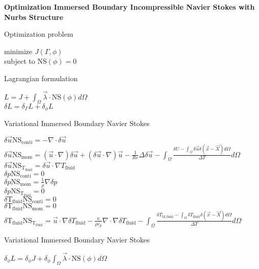 \documentclass[10pt]{article} %
\begin{document}
\begin{center}
	\textbf{Optimization Immersed Boundary Incompressible Navier Stokes with Nurbs Structure}
\begin{flushleft}
	Optimization problem
\end{flushleft}	
	minimize $J(\Gamma,\phi)$\\
	subject to $\text{NS}(\phi) = 0$
\begin{flushleft}
	Lagrangian formulation
\end{flushleft}	
	$L = J + \int_{\Omega} \vec{\lambda} \cdot \text{NS}(\phi)  d\Omega$\\
	$\delta L = \delta_\Gamma L + \delta_\phi L$\\
\begin{flushleft}
	Variational Immersed Boundary Navier Stokes
\end{flushleft}	
	$\delta\vec{u} \text{NS}_{\text{conti}} = - \nabla \cdot \delta\vec{u}$ \\
	$\delta\vec{u} \text{NS}_{\text{mom}} = (\vec{u}\cdot\nabla) \delta{\vec{u}} + (\delta{\vec{u}}\cdot\nabla)\vec{u}-\frac{1}{Re} \Delta \delta{\vec{u}} - \int_{\Omega}\frac{\delta U - \int_\Omega \delta\vec{u} \delta (\vec{x} - \vec{X}) d\Omega}{\Delta T}d\Omega$ \\
	$\delta\vec{u} \text{NS}_{\text{T}_{\text{fluid}}} = \delta\vec{u} \cdot \nabla T_{\text{fluid}} $ \\
	$\delta p \text{NS}_{\text{conti}} = 0$ \\
	$\delta p \text{NS}_{\text{mom}} = \frac{1}{\rho} \nabla \delta p $ \\
	$\delta p \text{NS}_{\text{T}_{\text{fluid}}} = 0 $ \\
	$\delta \text{T}_{\text{fluid}} \text{NS}_{\text{conti}} = 0$ \\
	$\delta \text{T}_{\text{fluid}} \text{NS}_{\text{mom}} = 0 $ \\
	$\delta \text{T}_{\text{fluid}} \text{NS}_{\text{T}_{\text{fluid}}} = \vec{u} \cdot \nabla \delta T_{\text{fluid}} - \frac{\kappa}{\rho c_p} \nabla \cdot \nabla \delta T_{\text{fluid}} - \int_{\Omega} \frac{\delta T_{\text{M,fluid}} - \int_{\Omega} \delta T_{\text{fluid}} \delta(\vec{x}-\vec{X}) d\Omega}{\Delta T} d\Omega $ \\
\begin{flushleft}
	Variational Immersed Boundary Navier Stokes
\end{flushleft}
	$\delta_\phi L = \delta_\phi J + \delta_\phi \int_{\Omega} \vec{\lambda} \cdot \text{NS}(\phi) d\Omega$\\

\end{center}
\end{document}
